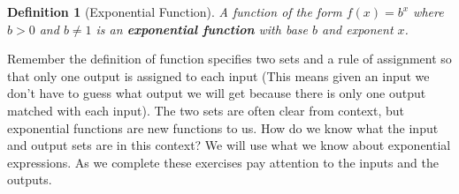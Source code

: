 \documentclass{article}
\theoremstyle{plain}
\theoremstyle{box}
\newtheorem*{definition*}{Definition}
\begin{document}
\begin{definition*}[Exponential Function]\hfill
A function of the form $f(x) = b^x$ where $b>0$ and $b \neq 1$ is an \textbf{exponential function} with base $b$ and exponent $x$.
\end{definition*}

Remember the definition of function specifies two sets and a rule of assignment so that only one output is assigned to each input (This means given an input we don't have to guess what output we will get because there is only one output matched with each input). The two sets are often clear from context, but exponential functions are new functions to us. How do we know what the input and output sets are in this context? We will use what we know about exponential expressions. As we complete these exercises pay attention to the inputs and the outputs.
\end{document}
